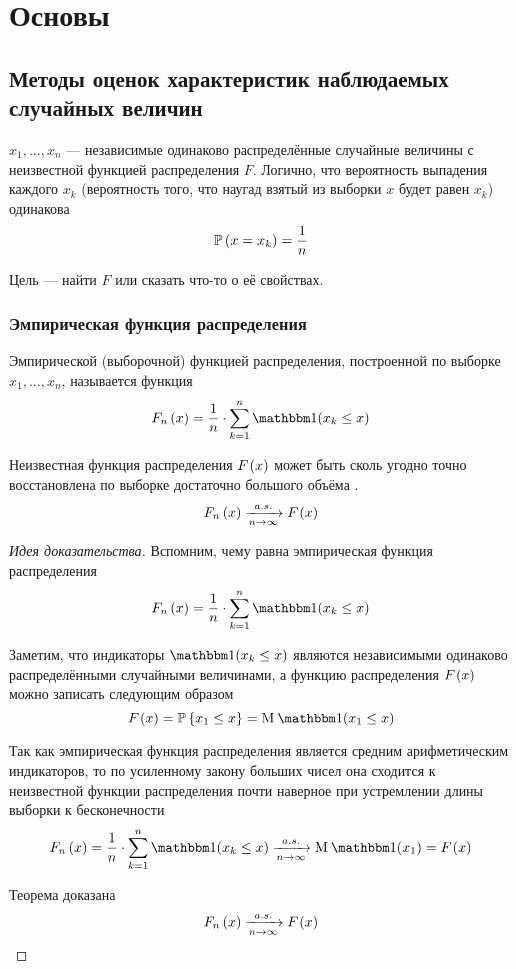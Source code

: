  \chapter{Основы}
\section{Методы оценок характеристик наблюдаемых случайных величин}
$x_1, \dots, x_n$ --- независимые одинаково распределённые случайные величины
с неизвестной функцией распределения $F$.
Логично, что вероятность выпадения каждого $x_k$
(вероятность того, что наугад взятый из выборки $x$ будет равен $x_k$)
одинакова
$$\mathbb{P}\left( x=x_k \right) = \frac{1}{n}$$

Цель --- найти $F$ или сказать что-то о её свойствах.

\subsection{Эмпирическая функция распределения}
\begin{definition}
    Эмпирической (выборочной) функцией распределения,
    построенной по выборке $x_1, \dots, x_n$, называется функция
    $$\cdfn{x}=\frac{1}{n}\cdot \sum_{k=1}^n
    \indicator{x_k\le x}$$
\end{definition}

\begin{theorem}\label{theorem:distributionFunction:empiricalToCumulative}
    Неизвестная функция распределения $F_{}\left(x\right)$ может быть сколь угодно
    точно восстановлена по выборке достаточно большого объёма
    \cite[стр.~25]{BorovkovMS}.
    $$F_n\left(x\right) \xrightarrow[n\to\infty]{a.s.} F_{}\left(x\right)$$
\end{theorem}
\begin{proof}[Идея доказательства]
Вспомним, чему равна эмпирическая функция распределения
$$\cdfn{x}=\frac{1}{n}\cdot \sum_{k=1}^n
\indicator{x_k\le x}$$

Заметим, что индикаторы $\indicator{x_k\le x}$
являются независимыми одинаково распределёнными случайными величинами,
а функцию распределения $F_{}\left(x\right)$ можно записать следующим образом
$$\cdf{x}=\Probability{x_1\le x}=\mean{\indicator{x_1\le x}}$$

Так как эмпирическая функция распределения является
средним арифметическим индикаторов, то по усиленному закону больших чисел
она сходится к неизвестной функции распределения почти наверное
при устремлении длины выборки к бесконечности
$$\cdfn{x}=\frac{1}{n}\cdot\sum_{k=1}^n\indicator{x_k\le x}
\acovergence\mean{\indicator{x_1}}=\cdf{x}$$

Теорема доказана
$$F_n\left(x\right) \xrightarrow[n\to\infty]{a.s.} F_{}\left(x\right)$$
\end{proof}

